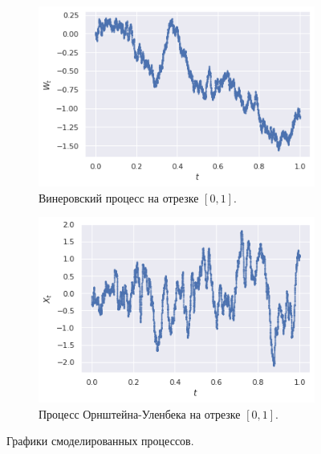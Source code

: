 \begin{figure}[ht]
    \centering
    \begin{subfigure}[b]{0.49\textwidth}
        \centering
        \includegraphics[width=\textwidth]{./resources/wiener_process.png}
        \caption{Винеровский процесс на отрезке $ [0, 1] $.}
        \label{subfig:wiener}
    \end{subfigure}
    \hfill
    \begin{subfigure}[b]{0.49\textwidth}
        \centering
        \includegraphics[width=\textwidth]{./resources/Orn_Uhl_process.png}
        \caption{Процесс Орнштейна-Уленбека на отрезке $ [0, 1] $.}
        \label{subfig:Orn_Uhl}
    \end{subfigure}
    \caption{Графики смоделированных процессов.}
    \label{fig:processes}
\end{figure}
